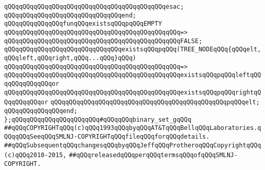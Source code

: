 \verb|qQQqqQQqqQQqqQQqqQQqqQQqqQQqqQQqqQQqqQQqqQQqesac;|\newline
\verb|qQQqqQQqqQQqqQQqqQQqqQQqqQQqqQQqend;|\newline
\newline
\verb|qQQqqQQqqQQqqQQqfunqQQqexistsqQQqpqQQqEMPTY|\newline
\verb|qQQqqQQqqQQqqQQqqQQqqQQqqQQqqQQqqQQqqQQqqQQqqQQq=>|\newline
\verb|qQQqqQQqqQQqqQQqqQQqqQQqqQQqqQQqqQQqqQQqqQQqqQQqFALSE;|\newline
\newline
\verb|qQQqqQQqqQQqqQQqqQQqqQQqqQQqqQQqexistsqQQqpqQQq(TREE_NODEqQQq{qQQqelt,qQQqleft,qQQqright,qQQq...qQQq}qQQq)|\newline
\verb|qQQqqQQqqQQqqQQqqQQqqQQqqQQqqQQqqQQqqQQqqQQqqQQq=>|\newline
\verb|qQQqqQQqqQQqqQQqqQQqqQQqqQQqqQQqqQQqqQQqqQQqqQQqexistsqQQqpqQQqleftqQQqqQQqqQQqqQQqor|\newline
\verb|qQQqqQQqqQQqqQQqqQQqqQQqqQQqqQQqqQQqqQQqqQQqqQQqexistsqQQqpqQQqrightqQQqqQQqqQQqor|\newline
\verb|qQQqqQQqqQQqqQQqqQQqqQQqqQQqqQQqqQQqqQQqqQQqqQQqpqQQqelt;|\newline
\verb|qQQqqQQqqQQqqQQqend;|\newline
\newline
\verb|};qQQqqQQqqQQqqQQqqQQqqQQq#qQQqqQQqbinary_set_gqQQq|\newline
\newline
\newline
\verb|##qQQqCOPYRIGHTqQQq(c)qQQq1993qQQqbyqQQqAT&TqQQqBellqQQqLaboratories.qQQqqQQqSeeqQQqSMLNJ-COPYRIGHTqQQqfileqQQqforqQQqdetails.|\newline
\verb|##qQQqSubsequentqQQqchangesqQQqbyqQQqJeffqQQqProtheroqQQqCopyrightqQQq(c)qQQq2010-2015,|\newline
\verb|##qQQqreleasedqQQqperqQQqtermsqQQqofqQQqSMLNJ-COPYRIGHT.|\newline

